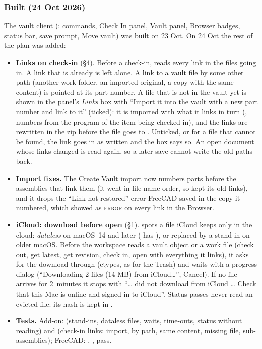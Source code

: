 \subsubsection*{Built (24 Oct 2026)}
The vault client (: commands, Check In panel, Vault panel, Browser badges, status
bar, save prompt, Move vault) was built on 23 Oct. On 24 Oct the rest of the plan was added:
\begin{itemize}[nosep]
  \item \textbf{Links on check-in} (\S4). Before a check-in,  reads every link in the
        files going in. A link that is already  is left alone. A link to a vault file by some other
        path (another work folder, an imported original, a copy with the same content) is pointed at its part number.
        A file that is not in the vault yet is shown in the panel's \emph{Links} box with ``Import it into the vault
        with a new part number and link to it'' (ticked): it is imported with what it links in turn
        (, numbers from the program of the item being checked in), and the
        links are rewritten in the zip before the file goes to . Unticked, or for a file that cannot be
        found, the link goes in as written and the box says so. An open document whose links changed is read again,
        so a later save cannot write the old paths back.
  \item \textbf{Import fixes.} The Create Vault import now numbers parts before the assemblies that link them (it went
        in file-name order, so  kept its old links), and it drops the ``Link not restored'' error
        FreeCAD saved in the copy it numbered, which showed as \textsc{error} on every link in the Browser.
  \item \textbf{iCloud: download before open} (\S1).  spots a file iCloud keeps only in the
        cloud: \emph{dataless} on macOS~14 and later ( has ), or replaced by a
         stand-in on older macOS. Before the workspace reads a vault object or a work file
        (check out, get latest, get revision, check in, open with everything it links), it asks for the download
        through  (ctypes, as for the Trash) and waits
        with a progress dialog (``Downloading 2 files (14 MB) from iCloud\ldots'', Cancel). If no file arrives for
        2~minutes it stops with ``\ldots{} did not download from iCloud \ldots{} Check that this Mac is online and
        signed in to iCloud''. Status passes never read an evicted file: its hash is kept in .
  \item \textbf{Tests.} Add-on:  (stand-ins, dataless files, waits, time-outs, status
        without reading) and  (check-in links: import, by path, same content, missing
        file, sub-assemblies); FreeCAD: , ,
         pass.
\end{itemize}
